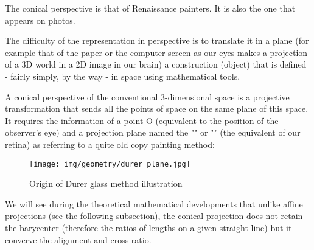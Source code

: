 	\begin{tcolorbox}[title=Remark,colframe=black,arc=10pt]
	The conical perspective is that of Renaissance painters. It is also the one that appears on photos.
	\end{tcolorbox}
	The difficulty of the representation in perspective is to translate it in a plane (for example that of the paper or the computer screen as our eyes makes a projection of a 3D world in a 2D image in our brain) a construction (object) that is defined - fairly simply, by the way - in space using mathematical tools.
	
	A conical perspective of the conventional $3$-dimensional space is a projective transformation that sends all the points of space on the same plane of this space. It requires the information of a point O (equivalent to the position of the observer's eye) and a projection plane named the "" or "" (the equivalent of our retina) as referring to a quite old copy painting method:
	\begin{figure}[H]
		\centering
		\texttt{[image: img/geometry/durer\_plane.jpg]}
		\caption{Origin of Durer glass method illustration}
	\end{figure}
	We will see during the theoretical mathematical developments that unlike affine projections (see the following subsection), the conical projection does not retain the barycenter (therefore the ratios of lengths on a given straight line) but it converve the alignment and cross ratio.
	
